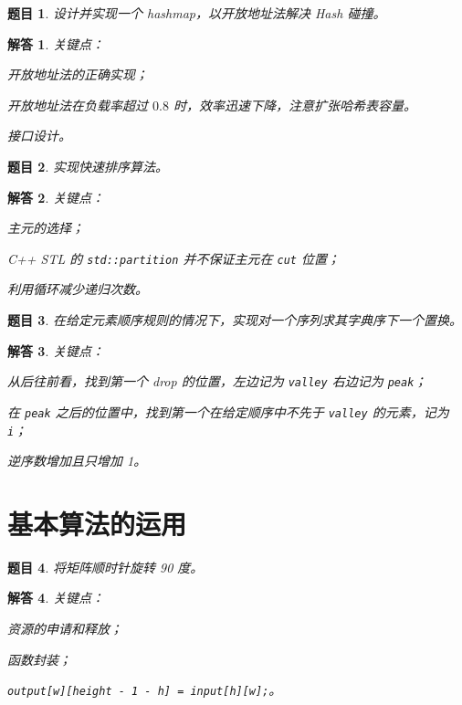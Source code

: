 \documentclass[UTF8, final]{ctexart}
\newtheorem{question}{题目}
\newtheorem{solution}{解答}
\begin{document}
\begin{question}
设计并实现一个 hashmap，以开放地址法解决 Hash 碰撞。
\end{question}
\begin{solution}
关键点：
\begin{compactitem}
    \item 开放地址法的正确实现；
    \item 开放地址法在负载率超过 $0.8$ 时，效率迅速下降，注意扩张哈希表容量。
    \item 接口设计。
\end{compactitem}

\end{solution}

\begin{question}
实现快速排序算法。
\end{question}
\begin{solution}
关键点：
\begin{compactitem}
    \item 主元的选择；
    \item C++ STL 的 \lstinline[style = lcpp]|std::partition| 并不保证主元在 \lstinline[style = lcpp]|cut| 位置；
    \item 利用循环减少递归次数。
\end{compactitem}

\end{solution}

\begin{question}
在给定元素顺序规则的情况下，实现对一个序列求其字典序下一个置换。
\end{question}
\begin{solution}
关键点：
\begin{compactitem}
    \item 从后往前看，找到第一个 drop 的位置，左边记为 \lstinline[style = lcpp]|valley| 右边记为 \lstinline[style = lcpp]|peak|；
    \item 在 \lstinline[style = lcpp]|peak| 之后的位置中，找到第一个在给定顺序中不先于 \lstinline[style = lcpp]|valley| 的元素，记为 \lstinline[style = lcpp]|i|；
    \item 逆序数增加且只增加 1。
\end{compactitem}

\end{solution}

\section{基本算法的运用}
\begin{question}
将矩阵顺时针旋转 90 度。
\end{question}
\begin{solution}
关键点：
\begin{compactitem}
    \item 资源的申请和释放；
    \item 函数封装；
    \item \lstinline[style = lcpp]|output[w][height - 1 - h] = input[h][w];|。
\end{compactitem}

\end{solution}
\end{document}
